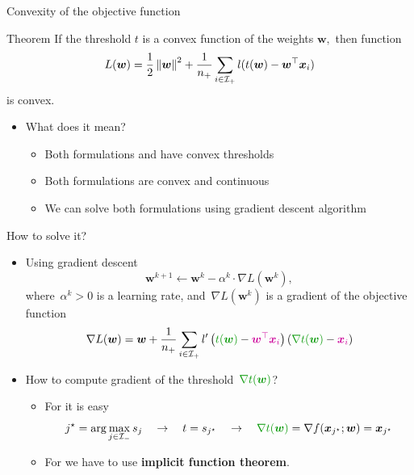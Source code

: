 \documentclass[10pt, aspectratio=169]{beamer}
\begin{document}
\begin{frame}{Convexity of the objective function}
  \begin{block}{Theorem}
    If the threshold $t$ is a convex function of the weights $\bm{w},$ then function
    \begin{equation*}
      L(\bm{w}) = \frac{1}{2} \norm{\bm{w}}^2 + \frac{1}{\npos} \sum_{i \in \Ipos} l(t(\bm{w}) - \bm{w}^{\top} \bm{x}_i)
    \end{equation*}
    is convex.
  \end{block}
  \begin{itemize}
    \item What does it mean? 
    \begin{itemize}
      \item Both formulations \TopPush and \PatMatNP have convex thresholds
      \item Both formulations are convex and continuous
      \item We can solve both formulations using gradient descent algorithm
    \end{itemize}
    
  \end{itemize}
\end{frame}

\begin{frame}{How to solve it?}
  \begin{itemize}
    \item Using gradient descent
    \begin{equation*}
      \bm{w}^{k+1} \gets \bm{w}^k - \alpha^k \cdot \nabla L(\bm{w}^k),
    \end{equation*}
    where~$\alpha^k > 0$ is a learning rate, and~$\nabla L(\bm{w}^k)$ is a gradient of the objective function
    \begin{equation*}
      \nabla L(\bm{w})
        = \bm{w} + \frac{1}{\npos} \sum_{i \in \Ipos} l'\Brac{{\color{mygreen}t(\bm{w})} - {\color{mypurple}\bm{w}^{\top} \bm{x}_i}}\Brac{{\color{mygreen}\nabla t(\bm{w})} - {\color{mypurple}\bm{x}_i}}
    \end{equation*}
    \item How to compute gradient of the threshold~${\color{mygreen}\nabla t(\bm{w})}$?
    \begin{itemize}
      \item For \TopPush it is easy
      \begin{equation*}
        j^{\star} = \arg \max_{j \in \Ineg} s_j \quad \rightarrow \quad 
        t = s_{j^{\star}}\quad \rightarrow \quad 
        {\color{mygreen}\nabla t(\bm{w})} = \nabla f(\bm{x}_{j^{\star}}; \bm{w}) = \bm{x}_{j^{\star}}
      \end{equation*}
      \item For \PatMatNP we have to use {\color{mygreen}\textbf{implicit function theorem}}.
    \end{itemize}
  \end{itemize}
\end{frame}
\end{document}
